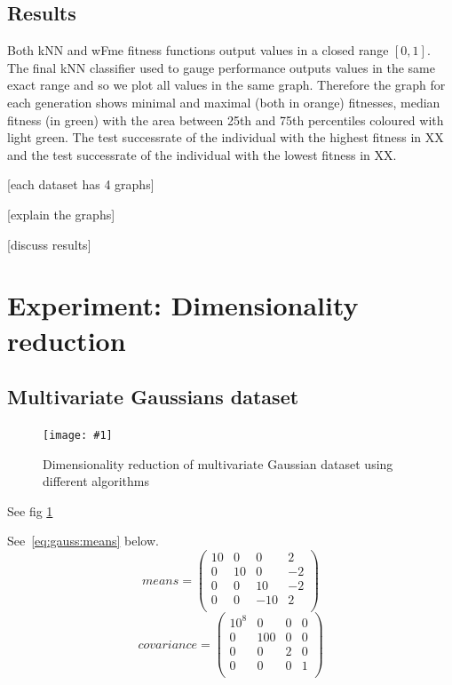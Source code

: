 \documentclass[12pt,a4paper]{report}
\newcommand{\cenfig}[3]{
\begin{figure}[ht]
	\centering
    \texttt{[image: \#1]}
    \caption{#2} \label{#3}
\end{figure}
}
\begin{document}
\subsection{Results}

Both kNN and wFme fitness functions output values in a closed range $[0,1]$. The final kNN classifier used to gauge performance outputs values in the same exact range and so we plot all values in the same graph. Therefore the graph for each generation shows minimal and maximal (both in orange) fitnesses, median fitness (in green) with the area between 25th and 75th percentiles coloured with light green. The test successrate of the individual with the highest fitness in XX and the test successrate of the individual with the lowest fitness in XX.

[each dataset has 4 graphs] %

[explain the graphs] %

[discuss results] %

\section{Experiment: Dimensionality reduction} \label{chap:exp:dimred}

\subsection{Multivariate Gaussians dataset} \label{chap:trivial-dataset}

\cenfig{graphs/dimred/gaussians}{Dimensionality reduction of multivariate Gaussian dataset using different algorithms}{fig:dimred:gauss}

See fig \ref{fig:dimred:gauss}

See~\eqref{eq:gauss:means} below.
\begin{equation} \label{eq:gauss:means}
means = \begin{pmatrix}
10 & 0 & 0 & 2 \\
0 & 10 & 0 & -2 \\
0 & 0 & 10 & -2 \\
0 & 0 & -10 & 2 \\
\end{pmatrix}
\end{equation}
\begin{equation} \label{eq:gauss:cov}
covariance = \begin{pmatrix}
10^8 & 0 & 0 & 0 \\
0 & 100 & 0 & 0 \\
0 & 0 & 2 & 0 \\
0 & 0 & 0 & 1 \\
\end{pmatrix}
\end{equation}
\end{document}
